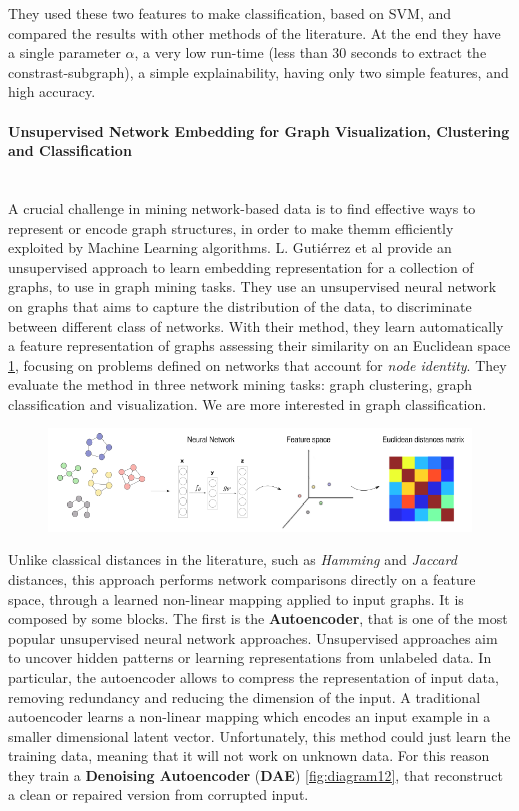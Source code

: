 They used these two features to make classification, based on SVM, and compared the results with other methods of the literature. At the end they have a single parameter $\alpha$, a very low run-time (less than 30 seconds to extract the constrast-subgraph), a simple explainability, having only two simple features, and high accuracy. 

\paragraph{Unsupervised Network Embedding for Graph Visualization, Clustering and Classification}\
\label{par:2}
\\

A crucial challenge in mining network-based data is to find effective ways to represent or encode graph structures, in order to make themm efficiently exploited by Machine Learning algorithms. L. Gutiérrez et al \cite{GutierrezUn} provide an unsupervised approach to learn embedding representation for a collection of graphs, to use in graph mining tasks. They use an unsupervised neural network on graphs that aims to capture the distribution of the data, to discriminate between different class of networks. With their method, they learn automatically a feature representation of graphs assessing their similarity on an Euclidean space \ref{fig:diagram11}, focusing on problems defined on networks that account for \textit{node identity}. They evaluate the method in three network mining tasks: graph clustering, graph classification and visualization. We are more interested in graph classification.

\begin{figure}[htbp]
	\centering
	\includegraphics[scale=0.5]{Immagini/Unsupervised.PNG}
	\caption{\label{fig:diagram11}}
\end{figure}


Unlike classical distances in the literature, such as \textit{Hamming} and \textit{Jaccard} distances, this approach performs network comparisons directly on a feature space, through a learned non-linear mapping applied to input graphs. It is composed by some blocks. The first is the \textbf{Autoencoder}, that is one of the most popular unsupervised neural network approaches. Unsupervised approaches aim to uncover hidden patterns or learning representations from unlabeled data. In particular, the autoencoder allows to compress the representation of input data, removing redundancy and reducing the dimension of the input. A traditional autoencoder learns a non-linear mapping which encodes an input example in a smaller dimensional latent vector. Unfortunately, this method could just learn the training data, meaning that it will not work on unknown data. For this reason they train a \textbf{Denoising Autoencoder} (\textbf{DAE}) \ref{fig:diagram12}, that reconstruct a clean or repaired version from corrupted input.

